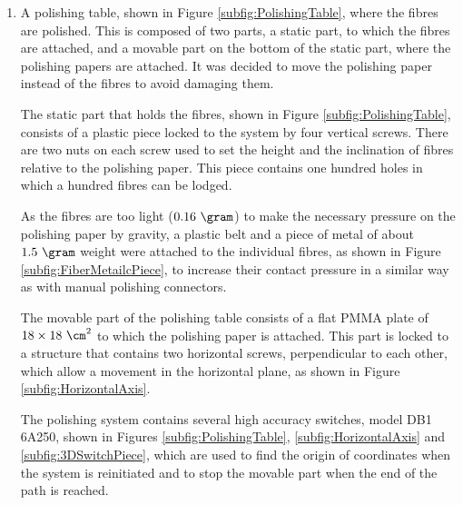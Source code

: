 \begin{enumerate}
\item{} A polishing table, shown in Figure \ref{subfig:PolishingTable}, where the fibres are polished. This is composed of two parts, a static part, to which the fibres are attached, and a movable part on the bottom of the static part, where the polishing papers are attached. It was decided to move the polishing paper instead of the fibres to avoid damaging them.

The static part that holds the fibres, shown in Figure \ref{subfig:PolishingTable}, consists of a plastic piece locked to the system by four vertical screws. There are two nuts on each screw used to set the height and the inclination of fibres relative to the polishing paper. This piece contains one hundred holes in which a hundred fibres can be lodged. 

As the fibres are too light ($0.16~\gram$) to make the necessary pressure on the polishing paper by gravity, a plastic belt and a piece of metal of about $1.5~\gram$ weight were attached to the individual fibres, as shown in Figure \ref{subfig:FiberMetailcPiece}, to increase their contact pressure in a similar way as with manual polishing connectors. 

The movable part of the polishing table consists of a flat PMMA plate of $18 \times 18~\cm^2$ to which the polishing paper is attached. This part is locked to a structure \cite{StructureAxis} that contains two horizontal screws, perpendicular to each other, which allow a movement in the horizontal plane, as shown in Figure \ref{subfig:HorizontalAxis}.

The polishing system contains several high accuracy switches, model DB1 6A250, shown in Figures \ref{subfig:PolishingTable}, \ref{subfig:HorizontalAxis} and \ref{subfig:3DSwitchPiece}, which are used to find the origin of coordinates when the system is reinitiated and to stop the movable part when the end of the path is reached. 


\end{enumerate}
